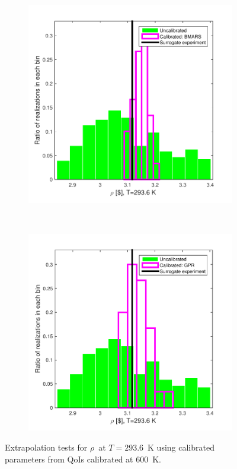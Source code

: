 \documentclass[review]{elsarticle}
\begin{document}
\begin{figure}[ht!]
\begin{subfigure}{0.5\textwidth}
\centering
\includegraphics[width=0.9\linewidth]{NSE15-48R1_Figure17a.pdf}
\end{subfigure}
~
\begin{subfigure}{0.5\textwidth}
\centering
\includegraphics[width=0.9\linewidth]{NSE15-48R1_Figure17b.pdf}
\end{subfigure}
\caption{Extrapolation tests for $\rho$~at $T=293.6$~K using calibrated parameters from QoIs calibrated at $600$~K.}
\label{exp}
\end{figure}
\end{document}
